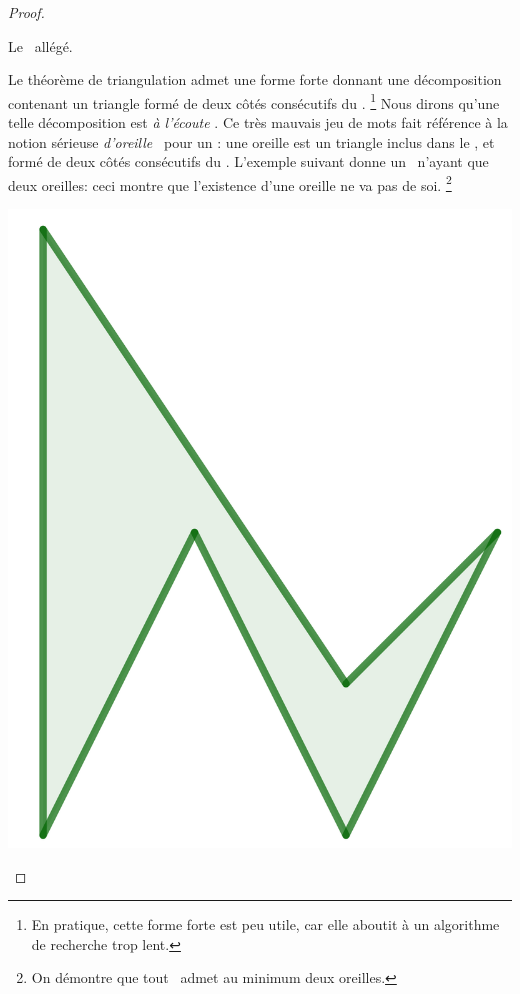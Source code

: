 \begin{proof}
\begin{multicols}{3}
\begin{center}
            \smallskip
            Le \ngone\ allégé.
        \end{center}
    \end{multicols}
    
    
    Le théorème de triangulation admet une forme forte donnant une décomposition contenant un triangle formé de deux côtés consécutifs du \ngone.%
    \footnote{
        En pratique, cette forme forte est peu utile, car elle aboutit à un algorithme de recherche trop lent.
    }
    Nous dirons qu'une telle décomposition est \og \emph{à l'écoute} \fg.
    Ce très mauvais jeu de mots fait référence à la notion sérieuse \og \emph{d'oreille} \fg\ pour un \ngone: une oreille est un triangle inclus dans le \ngone, et formé de deux côtés consécutifs du \ngone.
    L'exemple suivant donne un \ngone\ n'ayant que deux oreilles: ceci montre que l'existence d'une oreille ne va pas de soi.%
    \footnote{
        On démontre que tout \ngone\ admet au minimum deux oreilles.
    }


    \begin{multicols}{2}
        \small\itshape
    	\begin{center}
        	\includegraphics[scale=.4]{content/polygon/sufficient-cond/mini-ear-1.png}
        

\end{center}
\end{multicols}
\end{proof}

